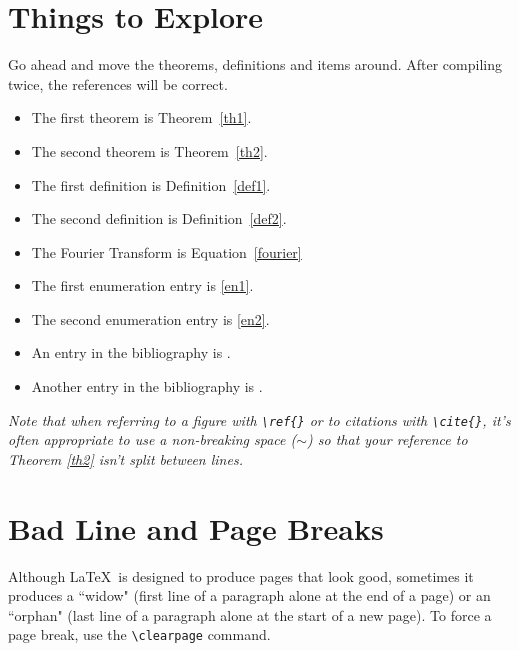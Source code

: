 \section{Things to Explore}\label{explore}

Go ahead and move the theorems, definitions and items around.
After compiling twice, the references will be correct.

\begin{itemize}
\item
The first theorem is Theorem~\ref{th1}.

\item
The second theorem is Theorem~\ref{th2}.

\item
The first definition is Definition~\ref{def1}.

\item
The second definition is Definition~\ref{def2}.

\item
The Fourier Transform is Equation~\ref{fourier}

\item
The first enumeration entry is \ref{en1}.

\item
The second enumeration entry is \ref{en2}.

\item
An entry in the bibliography is \cite{bib1}.

\item
Another entry in the bibliography is \cite{bib2}.

\nocite{bib3}

\end{itemize}

{\em Note that when referring to a figure with \verb+\ref{}+ or to
citations with \verb+\cite{}+, it's often appropriate to use a
non-breaking space ($\sim$) so that your reference to Theorem \ref{th2} isn't split between lines.
}


\section{Bad Line and Page Breaks}

Although \LaTeX \ is designed to produce pages that look good, sometimes it produces a ``widow" (first line of a paragraph alone at the end of a page) or an ``orphan" (last line of a paragraph alone at the start of a new page).
To force a page break, use the \verb+\clearpage+ command.

